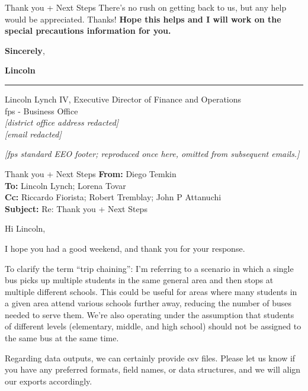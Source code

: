 {\begin{emailbox}{Thank you + Next Steps}
    There's no rush on getting back to us, but any help would be appreciated. Thanks! \textbf{Hope this helps and I will work on the special precautions information for you.} \vspace{1em}

    \textbf{Sincerely}, \vspace{1em}
    
    \textbf{Lincoln}

    \noindent\rule{\textwidth}{1pt}

    Lincoln Lynch IV, Executive Director of Finance and Operations \\
    \Acrlong{fps} - Business Office \\
    \textit{[district office address redacted]} \\
    \textit{[email redacted]} \vspace{1em}

    \textit{[\gls{fps} standard EEO footer; reproduced once here, omitted from subsequent emails.]}
\end{emailbox}

\begin{emailbox}{Thank you + Next Steps}
    \textbf{From:} Diego Temkin \\
    \textbf{To:} Lincoln Lynch; Lorena Tovar \\
    \textbf{Cc:} Riccardo Fiorista; Robert Tremblay; John P Attanuchi \\
    \textbf{Subject:} Re: Thank you + Next Steps

    \vspace{1em}
    Hi Lincoln, \vspace{1em}

    I hope you had a good weekend, and thank you for your response. \vspace{1em}

    To clarify the term ``trip chaining'': I’m referring to a scenario in which a single bus picks up multiple students in the same general area and then stops at multiple different schools. This could be useful for areas where many students in a given area attend various schools further away, reducing the number of buses needed to serve them. We're also operating under the assumption that students of different levels (elementary, middle, and high school) should not be assigned to the same bus at the same time. \vspace{1em}

    Regarding data outputs, we can certainly provide \acrshort{csv} files. Please let us know if you have any preferred formats, field names, or data structures, and we will align our exports accordingly. \vspace{1em}


\end{emailbox}}
